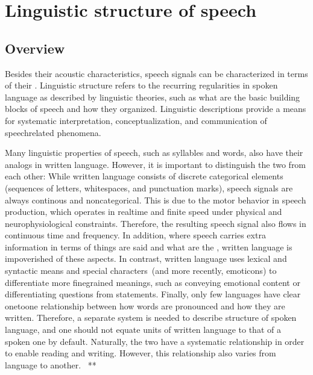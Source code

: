 \documentclass[letterpaper,10pt,english]{jupyterBook}
\begin{document}
\sphinxstepscope


\section{Linguistic structure of speech}
\label{\detokenize{Introduction/Linguistic_structure_of_speech:linguistic-structure-of-speech}}\label{\detokenize{Introduction/Linguistic_structure_of_speech::doc}}

\subsection{Overview}
\label{\detokenize{Introduction/Linguistic_structure_of_speech:overview}}
\sphinxAtStartPar
Besides their acoustic characteristics, speech signals can be
characterized in terms of their . Linguistic
structure refers to the recurring regularities in spoken language as
described by linguistic theories, such as what are the basic building
blocks of speech and how they organized. Linguistic descriptions provide
a means for systematic interpretation, conceptualization, and
communication of speech\sphinxhyphen{}related phenomena.

\sphinxAtStartPar
Many linguistic properties of speech, such as syllables and words, also
have their analogs in written language. However, it is important to
distinguish the two from each other: While written language consists of
discrete categorical elements (sequences of letters, whitespaces, and
punctuation marks), speech signals are always continous and
non\sphinxhyphen{}categorical. This is due to the motor behavior in speech production,
which operates in real\sphinxhyphen{}time and finite speed under physical and
neurophysiological constraints. Therefore, the resulting speech signal
also flows in continuous time and frequency. In addition, where speech
carries extra information in terms of  things are said and what are
the , written language is impoverished
of these aspects. In contrast, written language uses lexical and
syntactic means and special characters (and more recently, emoticons) to
differentiate more fine\sphinxhyphen{}grained meanings, such as conveying emotional
content or differentiating questions from statements. Finally, only few
languages have clear one\sphinxhyphen{}to\sphinxhyphen{}one relationship between how words are
pronounced and how they are written. Therefore, a separate system is
needed to describe structure of spoken language, and one should not
equate units of written language to that of a spoken one by default.
Naturally, the two have a systematic relationship in order to enable
reading and writing. However, this relationship also varies from
language to another.  **
\end{document}
